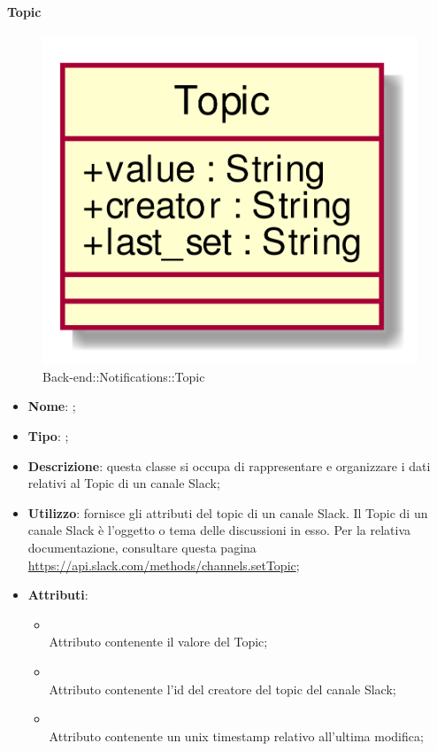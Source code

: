\hypertarget{Topic_label}{\paragraph{Topic}}
\begin{figure}[h]
	\centering
	\includegraphics[width=\textwidth,height=\textheight,keepaspectratio]{images/ClassTopic.png}
	\caption{Back-end::Notifications::Topic}
\end{figure}
\begin{itemize}
	\item \textbf{Nome}: ;
	\item \textbf{Tipo}: ;
	\item \textbf{Descrizione}: questa classe si occupa di rappresentare e organizzare i dati relativi al Topic di un canale Slack;
	\item \textbf{Utilizzo}: fornisce gli attributi del topic di un canale Slack.
Il Topic di un canale Slack è l'oggetto o tema delle discussioni in esso.
Per la relativa documentazione, consultare questa pagina \url{https://api.slack.com/methods/channels.setTopic};
	\item \textbf{Attributi}:
	\begin{itemize}
		\item[]  \\
		Attributo contenente il valore del Topic;
		\item[]  \\
		Attributo contenente l'id del creatore del topic del canale Slack;
		\item[]  \\
		Attributo contenente un unix timestamp relativo all'ultima modifica;
	\end{itemize}
\end{itemize}
\FloatBarrier

